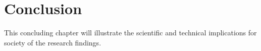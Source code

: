 \chapter{Conclusion}
\label{conclusion}

This concluding chapter will illustrate the scientific and technical
implications for society of the research findings.
